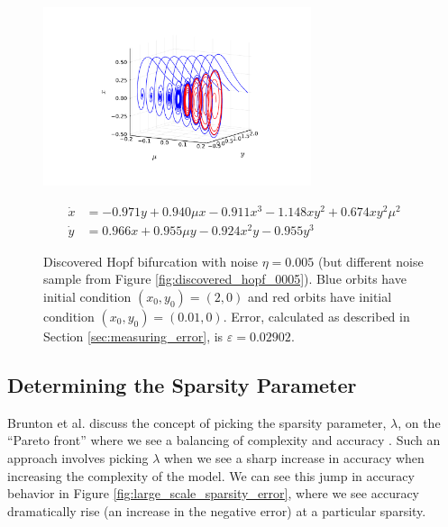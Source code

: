 \documentclass[10pt]{paper}
\begin{document}
\begin{figure}[H]
	\caption{Discovered Hopf bifurcation with noise $\eta = 0.005$ (but different noise sample from Figure \ref{fig:discovered_hopf_0005}). Blue orbits have initial condition $(x_0, y_0) = (2,0)$ and red orbits have initial condition $(x_0, y_0) = (0.01, 0)$. Error, calculated as described in Section \ref{sec:measuring_error}, is $\varepsilon = 0.02902$.}
	\label{fig:discovered_hopf_0005_2}

	\centering 

	\includegraphics[width = 0.7\textwidth, trim={4.3cm, 2cm, 4.2cm, 3cm}, clip]{found_hopf_bifurcation_0005_2.pdf}

	\[ \begin{aligned}
		\dot x &= -0.971y + 0.940\mu x -0.911x^3 -1.148xy^2 + 0.674xy^2\mu^2 \\
		\dot y &= 0.966x + 0.955\mu y -0.924x^2 y -0.955y^3
	\end{aligned} \]

\end{figure}

\subsection{Determining the Sparsity Parameter} \label{sec:determining_lambda}
Brunton et al. discuss the concept of picking the sparsity parameter, $\lambda$, on the ``Pareto front'' where we see a balancing of complexity and accuracy \cite{sindy}. 
Such an approach involves picking $\lambda$ when we see a sharp increase in accuracy when increasing the complexity of the model. 
We can see this jump in accuracy behavior in Figure \ref{fig:large_scale_sparsity_error}, where we see accuracy dramatically rise (an increase in the negative error) at a particular sparsity. 
\end{document}
